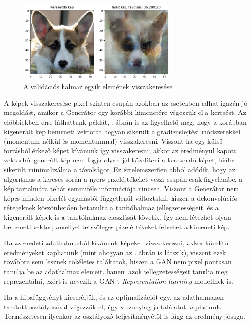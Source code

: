 \begin{figure}[h]
	\centering
	\includegraphics[width=8cm]{images/grad_search_val_image.png}
	\caption{A validációs halmaz egyik elemének visszakeresése}
	\label{fig:gradval}
\end{figure}



A képek visszakeresése pixel szinten csupán azokban az esetekben adhat igazán jó megoldást, amikor a Generátor egy korábbi kimenetére végezzük el a keresést. Az előbbiekben erre láthattunk példát, . ábrán is az figyelhető meg, hogy a korábban kigenerált kép bemeneti vektorát hogyan sikerült a gradienslejtési módszerekkel (momentum nélkül és momentummal) visszakeresni.
Viszont ha egy külső forrásból érkező képet kívánunk így visszakeresni, akkor az eredményül kapott vektorból generált kép nem fogja olyan jól közelíteni a keresendő képet, hiába sikerült minimalizálnia a távolságot.
Ez értelemszerűen abból adódik, hogy az algoritmus a keresés során a nyers pixelértékeket veszi csupán csak figyelembe, a kép tartalmára tehát semmiféle információja nincsen. Viszont a Generátor nem képes minden pixelét egymástól függetlenül változtatni, hiszen a dekonvolúciós rétegeknek köszönhetően betanulta a tanítóhalmaz jellegzetességeit, és a kigenerált képek is a tanítóhalmaz eloszlását követik. Így nem létezhet olyan bemeneti vektor, amellyel tetszőleges pixelértékeket felvehet a kimeneti kép.

Ha az eredeti adathalmazból  kívánunk képeket visszakeresni, akkor közelítő eredményeket kaphatunk (mint ahogyan az . ábrán is látszik), viszont ezek továbbra sem lesznek tökéletes találtatok, hiszen a GAN nem pixel pontosan tanulja be az adathalmaz elemeit, hanem azok jellegzetességeit tanulja meg reprezentálni, ezért is nevezik a GAN-t \textit{Representation-learning} \cite{geron2019hands} modellnek is.

Ha a hibafüggvényt kicseréljük, és az optimalizációt egy, az adathalmazon tanított osztályozóval végezzük el, úgy viszonylag jó találatot kaphatunk. Természetesen ilyenkor az osztályozó teljesítményétől is függ az eredmény jósága.

